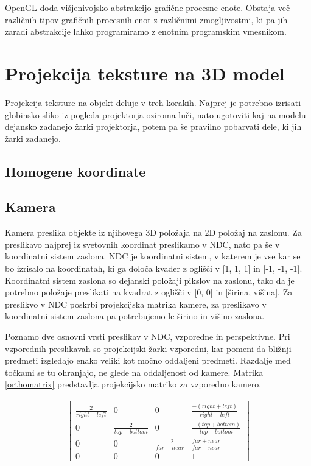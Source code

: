 \documentclass[a4paper, 12pt]{book}
\begin{document}
OpenGL doda višjenivojsko abstrakcijo grafične procesne enote. Obstaja več različnih tipov grafičnih procesnih enot z različnimi zmogljivostmi, ki pa jih zaradi abstrakcije lahko programiramo z enotnim programskim vmesnikom. 
\section{Projekcija teksture na 3D model}

Projekcija teksture na objekt deluje v treh korakih. Najprej je potrebno izrisati globinsko sliko iz pogleda projektorja oziroma luči, nato ugotoviti kaj na modelu dejansko zadanejo žarki projektorja, potem pa še pravilno pobarvati dele, ki jih žarki zadanejo.

\subsection*{Homogene koordinate}



\subsection*{Kamera}

Kamera preslika objekte iz njihovega 3D položaja na 2D položaj na zaslonu. Za preslikavo najprej iz svetovnih koordinat preslikamo v NDC, nato pa še v koordinatni sistem zaslona. NDC je koordinatni sistem, v katerem je vse kar se bo izrisalo na koordinatah, ki ga določa kvader z oglišči v [1, 1, 1] in [-1, -1, -1]. Koordinatni sistem zaslona so dejanski položaji pikslov na zaslonu, tako da je potrebno položaje preslikati na kvadrat z oglišči v [0, 0] in [širina, višina]. Za preslikvo v NDC poskrbi projekcijska matrika kamere, za preslikavo v koordinatni sistem zaslona pa potrebujemo le širino in višino zaslona.

Poznamo dve osnovni vrsti preslikav v NDC, vzporedne in perspektivne. Pri vzporednih preslikavah so projekcijski žarki vzporedni, kar pomeni da bližnji predmeti izgledajo enako veliki kot močno oddaljeni predmeti. Razdalje med točkami se tu ohranjajo, ne glede na oddaljenost od kamere. Matrika \ref{orthomatrix} predstavlja projekcijsko matriko za vzporedno kamero.

\begin{align}
\begin{bmatrix}
\frac{2}{right-left} & 0 & 0 & \frac{-(right+left)}{right-left}\\ 
0 & \frac{2}{top-bottom} & 0 & \frac{-(top+bottom)}{top-bottom} \\ 
0 & 0 & \frac{-2}{far-near} & \frac{far+near}{far-near} \\ 
0 & 0 & 0 & 1
\end{bmatrix}
\label{orthomatrix}
\end{align}
\end{document}
